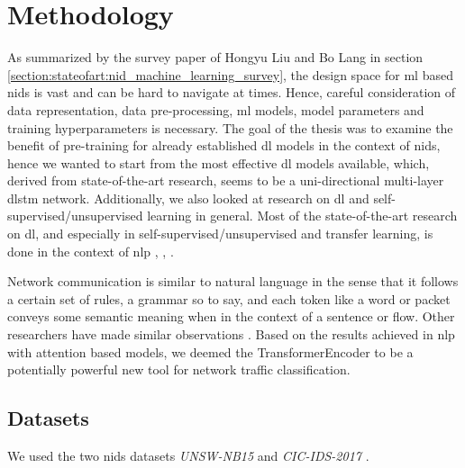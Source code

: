 \chapter{Methodology} \label{sec:methodology}

As summarized by the survey paper \cite{nid_ml_survey_2019} of Hongyu Liu and Bo Lang in section \ref{section:stateofart:nid_machine_learning_survey}, the design space for \gls{ml} based \gls{nids} is vast and can be hard to navigate at times. Hence, careful consideration of data representation, data pre-processing, \gls{ml} models, model parameters and training hyperparameters is necessary. The goal of the thesis was to examine the benefit of pre-training for already established \gls{dl} models in the context of \gls{nids}, hence we wanted to start from the most effective \gls{dl} models available, which, derived from state-of-the-art research, seems to be a uni-directional multi-layer \gls{dlstm} network. Additionally, we also looked at research on \gls{dl} and self-supervised/unsupervised learning in general. Most of the state-of-the-art research on \gls{dl}, and especially in self-supervised/unsupervised and transfer learning, is done in the context of \gls{nlp} \cite{bert}, \cite{elmo}, \cite{attention}.

Network communication is similar to natural language in the sense that it follows a certain set of rules, a grammar so to say, and each token like a word or packet conveys some semantic meaning when in the context of a sentence or flow. Other researchers have made similar observations \cite{anomaly_detection_recurrent_neural_networks}. Based on the results achieved in \gls{nlp} with attention based models, we deemed the TransformerEncoder to be a potentially powerful new tool for network traffic classification. 

\section{Datasets} \label{sec:methodology:datasets}

We used the two \gls{nids} datasets \textit{UNSW-NB15} \cite{unsw_nb15} and \textit{CIC-IDS-2017} \cite{cic_ids_2017}. \par


